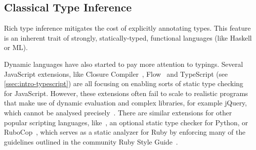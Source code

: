 \documentclass[acmsmall, review, anonymous]{acmart}\settopmatter{printfolios=true,printccs=false,printacmref=false}
\newcommand{\margincomment}[2]{\marginpar{\scriptsize\color{Maroon}#1 says: #2}}
\newcommand{\adg}[1]{\margincomment{ADG}{#1}}
\newcommand{\etb}[1]{\margincomment{Earl}{#1}}
\begin{document}
\subsection{Classical Type Inference}


Rich type inference mitigates the cost
of explicitly annotating types. This feature is an
inherent trait of strongly, statically-typed, functional languages (like Haskell or ML).


Dynamic languages have also started to pay more attention to typings. Several
JavaScript extensions, like Closure Compiler~\citep{closure}, Flow~\cite{flow} and
TypeScript (see \cref{ssec:intro-typescript}) are all focusing on enabling
sorts of static type checking for JavaScript.
%
%
However, these
extensions often fail to scale to realistic programs that make use of dynamic
evaluation and complex libraries, for example jQuery, which cannot be analysed
precisely~\cite{jensen2009}.
%
There are similar extensions for other popular scripting languages,
like~\citep{mypy}, an optional static type checker for Python,
or RuboCop~\citep{rubycop}, which serves as a static analyzer for Ruby by enforcing many of the guidelines
outlined in the community Ruby Style Guide~\citep{rubystyle}.
\end{document}

